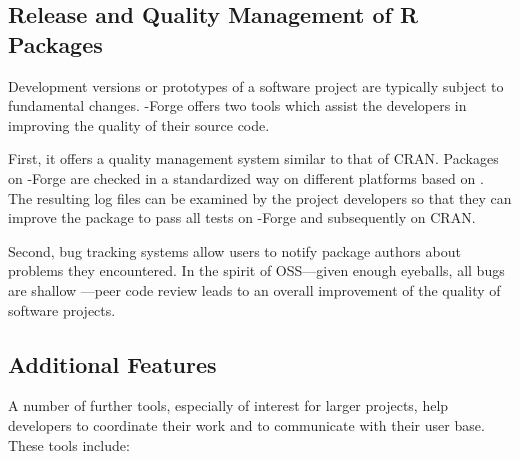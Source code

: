 \subsection{Release and Quality Management of R Packages}
\label{sec:release_and_quality_management}

Development versions or prototypes of a software project are typically
subject to fundamental changes. \R{}-Forge offers
two tools which assist the developers in improving the quality of
their source code.

First, it offers a quality management system similar to 
that of CRAN. Packages on \R{}-Forge are checked in a
standardized way on different platforms based on
. The resulting log files can be examined by the
project developers so that they can improve
the package to pass all tests on \R{}-Forge and subsequently on CRAN.

Second, bug tracking systems allow users to notify
package authors about problems they encountered. In the spirit of
OSS---given enough eyeballs, all bugs are shallow
\citep{forge:Raymond:1999}---peer code review leads to an 
overall improvement of the quality of software projects.

\subsection{Additional Features}

A number of further tools, especially of interest for larger
projects, help developers to coordinate their work and to communicate
with their user base. These tools include:

